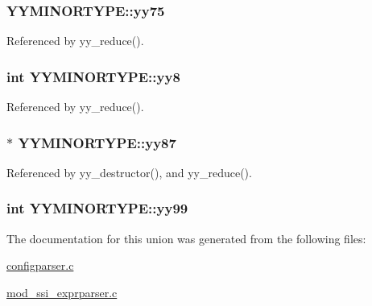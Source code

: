 \hypertarget{unionYYMINORTYPE_a4a4ca1931faf6dbb20c7540be932327c}{
\subsubsection[{yy75}]{ Y\-Y\-M\-I\-N\-O\-R\-T\-Y\-P\-E\-::yy75}}\label{unionYYMINORTYPE_a4a4ca1931faf6dbb20c7540be932327c}


Referenced by yy\-\_\-reduce().

\hypertarget{unionYYMINORTYPE_a810fb4ec5da24ae57f20bd1936634c78}{
\subsubsection[{yy8}]{\setlength{\rightskip}{0pt plus 5cm}int Y\-Y\-M\-I\-N\-O\-R\-T\-Y\-P\-E\-::yy8}}\label{unionYYMINORTYPE_a810fb4ec5da24ae57f20bd1936634c78}


Referenced by yy\-\_\-reduce().

\hypertarget{unionYYMINORTYPE_a54ab2ffdb41322bd4d7d56e1327d3f42}{
\subsubsection[{yy87}]{$\ast$ Y\-Y\-M\-I\-N\-O\-R\-T\-Y\-P\-E\-::yy87}}\label{unionYYMINORTYPE_a54ab2ffdb41322bd4d7d56e1327d3f42}


Referenced by yy\-\_\-destructor(), and yy\-\_\-reduce().

\hypertarget{unionYYMINORTYPE_aaa14f75383c9f52ec7c222d3a87585e8}{
\subsubsection[{yy99}]{\setlength{\rightskip}{0pt plus 5cm}int Y\-Y\-M\-I\-N\-O\-R\-T\-Y\-P\-E\-::yy99}}\label{unionYYMINORTYPE_aaa14f75383c9f52ec7c222d3a87585e8}


The documentation for this union was generated from the following files\-:\begin{DoxyCompactItemize}
\item 
\hyperlink{configparser_8c}{configparser.\-c}\item 
\hyperlink{mod__ssi__exprparser_8c}{mod\-\_\-ssi\-\_\-exprparser.\-c}\end{DoxyCompactItemize}
